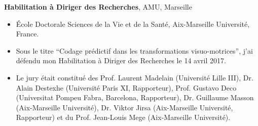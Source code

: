 \documentclass[10pt,french,a4paper,oneside]{article}%
\newcommand{\years}[1]{\marginpar{\textit{\scriptsize #1}}}
\begin{document}
\textbf{Habilitation à Diriger des Recherches}, AMU, Marseille\hfill \years{\textbf{2017}}\\
\vspace*{-.15in}
\begin{itemize}
\item[] \'Ecole Doctorale Sciences de la Vie et de la Santé, Aix-Marseille Université, France.
\item[] Sous le titre ``Codage prédictif dans les transformations visuo-motrices'', j'ai défendu mon Habilitation à Diriger des Recherches le 14 avril 2017.
\item[] Le jury était constitué des Prof. Laurent Madelain (Université Lille III), Dr. Alain Destexhe (Université Paris XI, Rapporteur), Prof. Gustavo Deco (Universitat Pompeu Fabra, Barcelona, Rapporteur), Dr. Guillaume Masson (Aix-Marseille Université), Dr. Viktor Jirsa (Aix-Marseille Université, Rapporteur) et du Prof. Jean-Louis Mege (Aix-Marseille Université).
\end{itemize} %
\end{document}
